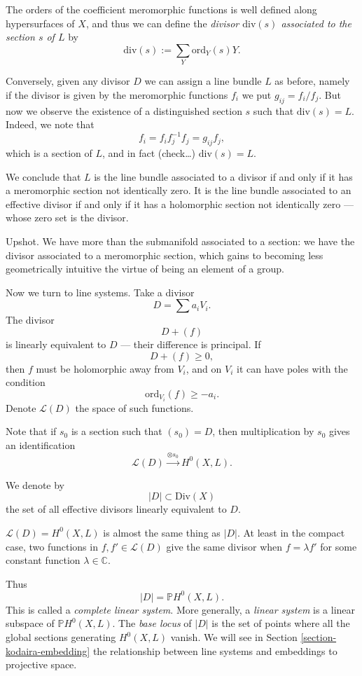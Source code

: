 \documentclass{book}
\begin{document}
The orders of the coefficient meromorphic
functions
is well defined along hypersurfaces of $X$,
and thus
we can define the
{\it divisor $\text{div}(s)$ associated to
the section $s$ of $L$}
by
$$
\text{div}(s)
:= \sum_Y\text{ord}_Y(s)Y.
$$

Conversely, given any divisor $D$
we can assign a line bundle $L$ as before,
namely if the divisor is given by the
meromorphic functions $f_i$
we put $g_{ij}=f_i/f_j$.
But now we observe
the existence of a distinguished section $s$
such that $\text{div}(s)=L$.
Indeed, we note that
$$
f_i=f_if_j^{-1}f_j=g_{ij}f_j,
$$
which is a section of $L$,
and in fact (check…) $\text{div}(s)=L$.

We conclude that $L$ is the line bundle
associated to a divisor
if and only if it has a meromorphic section
not identically zero.
It is the line bundle associated to an
effective divisor
if and only if it has a holomorphic section
not identically zero
--- whose zero set is the divisor.

\medskip\noindent
Upshot. We have more than the submanifold
associated to a section:
we have the divisor associated to a
meromorphic section,
which gains to becoming less geometrically
intuitive
the virtue of being an element of a group.

\medskip\noindent
Now we turn to line systems.
Take a divisor
$$
D=\sum a_iV_i.
$$
The divisor
$$
D+(f)
$$
is linearly equivalent to $D$ --- their
difference is principal.
If
$$
D+(f)\geq 0,
$$
then $f$ must be holomorphic away from $V_i$,
and on $V_i$ it can have poles with the
condition
$$
\text{ord}_{V_i}(f) \geq  -a_i.
$$
Denote $\mathcal{L}(D)$ the space of such
functions.

Note that if $s_0$ is a section such that
$(s_0)=D$, then multiplication by $s_0$ gives
an identification
$$
\mathcal{L}(D) \xrightarrow{\otimes s_0}
H^0(X,L).
$$

\begin{definition}
\label{definition-line-system}
We denote by
$$
|D|\subset \text{Div}(X)
$$
the set of all effective divisors linearly
equivalent to $D$.
\end{definition}

\noindent
$\mathcal{L}(D)=H^0(X,L)$ is almost the same
thing as $|D|$.
At least in the compact case,
two functions in $f,f' \in \mathcal{L}(D)$
give the same divisor when $f=\lambda f'$
for some constant function $\lambda \in
\mathbb{C}$.

Thus
$$
|D|=\mathbb{P}H^0(X,L).
$$
This is called a {\it complete linear
system}.
More generally, a {\it linear system} is a
linear
subspace of $\mathbb{P}H^0(X,L)$.
The {\it base locus} of $|D|$
is the set of points where all the global
sections
generating $H^0(X,L)$ vanish.
We will see in Section
\ref{section-kodaira-embedding}
the relationship between line systems and
embeddings to projective space.
\end{document}
